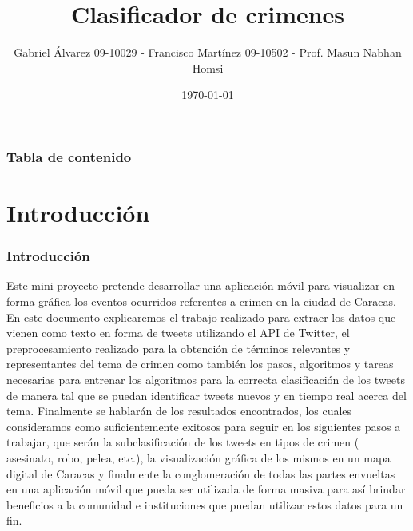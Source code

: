 \documentclass{beamer}
\title[Proyecto Final]{Clasificador de crimenes} %
\author{Gabriel \'{A}lvarez 09-10029 - Francisco Mart\'{i}nez 09-10502 - Prof. Masun Nabhan Homsi} %
\institute[USB] %
{
Universidad Sim\'{o}n Bol\'{i}var \\ %
\medskip
\textit{gabrielaar11@gmail.com - frammnm@gmail.com - mnabhan@usb.ve} %
}
\date{\today} %
\begin{document}
    

\begin{frame}
\titlepage %
\end{frame}

\begin{frame}[allowframebreaks=0.95]
\frametitle{Tabla de contenido} %
\tableofcontents %
\end{frame}


\section{Introducci\'{o}n} %
\begin{frame}
\frametitle{Introducci\'{o}n}
Este mini-proyecto pretende desarrollar una aplicaci\'{o}n m\'{o}vil para visualizar en forma gráfica los eventos ocurridos referentes a crimen en la ciudad de Caracas. En este documento explicaremos el trabajo realizado para extraer los datos que vienen como texto en forma de tweets utilizando el API de Twitter, el preprocesamiento realizado para la obtención de términos relevantes y representantes del tema de crimen como también los pasos, algoritmos y tareas necesarias para entrenar los algoritmos para la correcta clasificación de los tweets de manera tal que se puedan identificar tweets nuevos y en tiempo real acerca del tema. Finalmente se hablarán de los resultados encontrados, los cuales consideramos como suficientemente exitosos para seguir en los siguientes pasos a trabajar, que serán la subclasificación de los tweets en tipos de crimen ( asesinato, robo, pelea, etc.), la visualización gráfica de los mismos en un mapa digital de Caracas y finalmente la conglomeración de todas las partes envueltas en una aplicación móvil que pueda ser utilizada de forma masiva para así brindar beneficios a la comunidad e instituciones que puedan utilizar estos datos para un fin. 
\end{frame}
\end{document}
